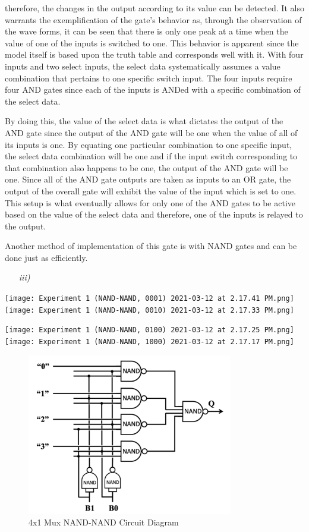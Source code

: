 \documentclass[12pt]{article}
\newcommand{\objects}[2]{%
  \leavevmode\vbox{\hbox{#1}\nointerlineskip\hbox{#2}}%
}
\begin{document}
therefore, the changes in the output according to its value can be detected. It
also warrants the exemplification of the gate's behavior as, through the
observation of the wave forms, it can be seen that there is only one peak at a
time when the value of one of the inputs is switched to one. This behavior is
apparent since the model itself is based upon the truth table and corresponds
well with it. With four inputs and two select inputs, the select data
systematically assumes a value combination that pertains to one specific switch
input. The four inputs require four AND gates since each of the inputs is ANDed
with a specific combination of the select data.
\par By doing this, the value of the select data is what dictates the output of
the AND gate since the output of the AND gate will be one when the value of all
of its inputs is one. By equating one particular combination to one specific
input, the select data combination will be one and if the input switch
corresponding to that combination also happens to be one, the output of the AND
gate will be one.  Since all of the AND gate outputs are taken as inputs to an
OR gate, the output of the overall gate will exhibit the value of the input
which is set to one.  This setup is what eventually allows for only one of the
AND gates to be active based on the value of the select data and therefore, one
of the inputs is relayed to the output.
\par Another method of implementation of this gate is with NAND gates and can be
done just as efficiently.
\begin{itemize}
    \item[\textit{iii)}]
\end{itemize}
\begin{center}
    \objects
        {\texttt{[image: Experiment 1 (NAND-NAND, 0001)
        2021-03-12 at 2.17.41 PM.png]}}
        {\texttt{[image: Experiment 1 (NAND-NAND, 0010)
        2021-03-12 at 2.17.33 PM.png]}}
    \objects
        {\texttt{[image: Experiment 1 (NAND-NAND, 0100)
        2021-03-12 at 2.17.25 PM.png]}}
        {\texttt{[image: Experiment 1 (NAND-NAND, 1000)
        2021-03-12 at 2.17.17 PM.png]}}
\end{center}
\begin{figure}[h]
    \centering
    \includegraphics[width=0.8\textwidth]{4x1 Mux NAND-NAND Circuit Diagram.png}
    \caption{4x1 Mux NAND-NAND Circuit Diagram}
\end{figure}
\end{document}
